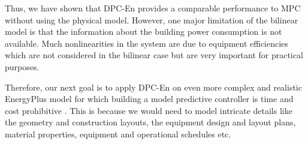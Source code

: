 Thus, we have shown that DPC-En provides a comparable performance to MPC without using the physical model.
However, one major limitation of the bilinear model is that the information about the building power consumption is not available. Much nonlinearities in the system are due to equipment efficiencies which are not considered in the bilinear case but are very important for practical purposes. 

Therefore, our next goal is to apply DPC-En on even more complex and realistic EnergyPlus model for which building a model predictive controller is time and cost prohibitive \cite{Sturzenegger2016}. This is because we would need to model intricate details like the geometry and construction layouts, the equipment design and layout plans, material properties, equipment and operational schedules etc.

